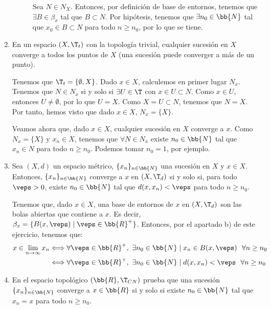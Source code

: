 \begin{ejercicio}
\begin{enumerate}[label=\alph*)]
\begin{description}
                Sea $N\in N_X$. Entonces, por definición de base de entornos, tenemos que $\exists B\in \beta_x$ tal que $B\subset N$. Por hipótesis, tenemos que $\exists n_0\in \bb{N}$ tal que $x_0\in B\subset N$ para todo $n\geq n_0$, por lo que se tiene.
        \end{description}   

        \item En un espacio $(X,\T_t)$ con la topología trivial, cualquier sucesión en $X$ converge a todos los puntos de $X$ (una sucesión puede converger a más de un punto).

        Tenemos que $\T_t=\{\emptyset, X\}$. Dado $x\in X$, calculemos en primer lugar $N_x$. Tenemos que $N\in N_x$ si y solo si $\exists U\in \T$ con $x\in U\subset N$. Como $x\in U$, entonces $U\neq \emptyset$, por lo que $U=X$. Como $X=U\subset N$, tenemos que $N=X$. Por tanto, hemos visto que dado $x\in X$, $N_x=\{X\}$.

        Veamos ahora que, dado $x\in X$, cualquier sucesión en $X$ converge a $x$. Como $N_x=\{X\}$ y $x_n\in X$, tenemos que $\forall N\in N_x$ existe $n_0\in \bb{N}$ tal que $x_n\in N$ para todo $n\geq n_0$. Podemos tomar $n_0=1$, por ejemplo.

        \item Sea $(X,d)$ un espacio métrico, $\{x_n\}_{n\in \bb{N}}$ una sucesión en $X$ y $x\in X$. Entonces, $\{x_n\}_{n\in \bb{N}}$ converge a $x$ en $(X,\T_d)$ si y solo si, para todo $\veps>0$, existe $n_0\in \bb{N}$ tal que $d(x,x_n)<\veps$ para todo $n\geq n_0$.

        Tenemos que, dado $x\in X$, una base de entornos de $x$ en $(X,\T_d)$ son las bolas abiertas que contiene a $x$. Es decir, $\beta_x=\{B(x,\veps)\mid \veps\in \bb{R}^+\}$. Entonces, por el apartado b) de este ejercicio, tenemos que:
        \begin{equation*}\begin{split}
            x\in \lim_{n\to \infty}x_n &\Longleftrightarrow
            \forall \veps\in \bb{R}^+,~ \exists n_0\in \bb{N}\mid x_n\in B(x,\veps)~~  \forall n\geq n_0\\
            &\Longleftrightarrow
            \forall \veps\in \bb{R}^+,~ \exists n_0\in \bb{N}\mid d(x,x_n)<\veps~~  \forall n\geq n_0
        \end{split}\end{equation*}

        \item En el espacio topológico $(\bb{R}, \T_{CN})$ prueba que una sucesión $\{x_n\}_{n\in \bb{N}}$ converge a $x\in \bb{R}$ si y solo si existe $n_0\in \bb{N}$ tal que $x_n=x$ para todo $n\geq n_0$.


\end{enumerate}
\end{ejercicio}
